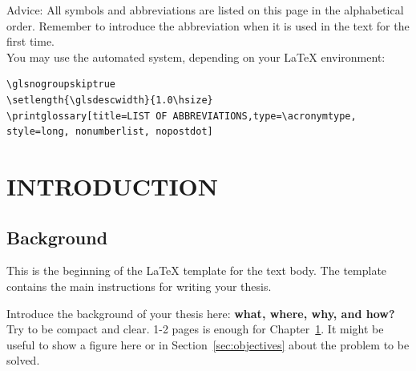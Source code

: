 \documentclass{lutmscthesis}[2017/10/03]
\begin{document}
\tableofcontents



\glsnogroupskiptrue
\setlength{\glsdescwidth}{1.0\hsize}
\printglossary[title=LIST OF ABBREVIATIONS,type=\acronymtype, style=long, nonumberlist, nopostdot]

Advice: All symbols and abbreviations are listed on this page in the alphabetical order. 
Remember to introduce the abbreviation when it is used in the text for the first time.\\

You may use the automated system, depending on your LaTeX environment:
\begin{verbatim}
\glsnogroupskiptrue
\setlength{\glsdescwidth}{1.0\hsize}
\printglossary[title=LIST OF ABBREVIATIONS,type=\acronymtype, 
style=long, nonumberlist, nopostdot]
\end{verbatim}

%

\setlength{\parskip}{3ex}



\section{INTRODUCTION}
\label{sec:introduction}

\subsection{Background}
\label{sec:background}

This is the beginning of the LaTeX template for the text body. 
The template contains the main instructions for writing your thesis. 

Introduce the background of your thesis here: {\bf what, where, why, and how?}
Try to be compact and clear. 1-2 pages is enough for Chapter~\ref{sec:introduction}. 
It might be useful to show a figure here or in Section~\ref{sec:objectives} about the problem to be solved. 
\end{document}
